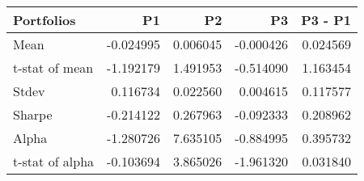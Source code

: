\begin{tabular}{lrrrr}
\toprule
Portfolios & P1 & P2 & P3 & P3 - P1 \\
\midrule
Mean & -0.024995 & 0.006045 & -0.000426 & 0.024569 \\
t-stat of mean & -1.192179 & 1.491953 & -0.514090 & 1.163454 \\
Stdev & 0.116734 & 0.022560 & 0.004615 & 0.117577 \\
Sharpe & -0.214122 & 0.267963 & -0.092333 & 0.208962 \\
Alpha & -1.280726 & 7.635105 & -0.884995 & 0.395732 \\
t-stat of alpha & -0.103694 & 3.865026 & -1.961320 & 0.031840 \\
\bottomrule
\end{tabular}
